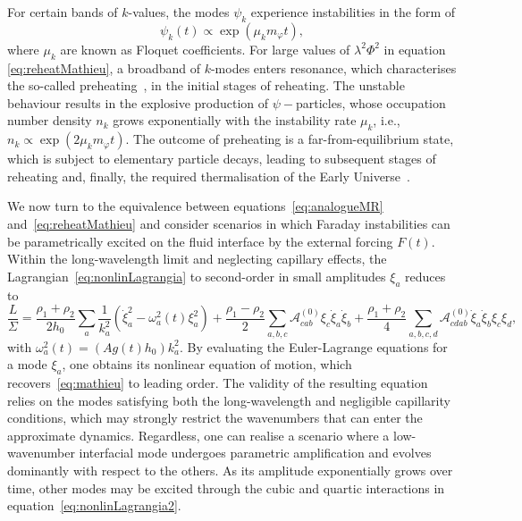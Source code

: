 \documentclass[a4paper]{jpconf}
\newcommand{\pow}[2]{#1^{(#2)}}
\begin{document}
For certain bands of $k$-values, the modes $\psi_k$ experience instabilities in the form of
\begin{equation}
    \psi_k (t)\propto \exp(\mu_k m_{\varphi} t),
\end{equation}
where $\mu_k$ are known as Floquet coefficients. For large values of $\lambda^2\Phi^2$ in equation \eqref{eq:reheatMathieu}, a broadband of $k$-modes enters resonance, which characterises the so-called preheating~\cite{Kofman94}, in the initial stages of reheating. The unstable behaviour results in the explosive production of $\psi-$particles, whose occupation number density $n_k$ grows exponentially with the instability rate $\mu_k$, i.e., $n_k\propto \exp(2\mu_k m_\varphi t)$. The outcome of preheating is a far-from-equilibrium state, which is subject to elementary particle decays, leading to subsequent stages of reheating and, finally, the required thermalisation of the Early Universe~\cite{Mukhanov2005PhysicalCosmology}. 

We now turn to the equivalence between equations~\eqref{eq:analogueMR} and~\eqref{eq:reheatMathieu} and consider scenarios in which Faraday instabilities can be parametrically excited on the fluid interface by the external forcing $F(t)$. Within the long-wavelength limit and neglecting capillary effects, the Lagrangian~\eqref{eq:nonlinLagrangia} to second-order in small amplitudes $\xi_a$ reduces to
\begin{equation}
\label{eq:nonlinLagrangia2}
    \frac{L}{\Sigma}
    =\frac{\rho_1+\rho_2}{2h_0}\sum_a\frac{1}{k_a^2}\left(\dot{\xi}_a^2-\omega_a^2(t)\xi_a^2\right)
    +\frac{\rho_1-\rho_2}{2}\sum_{a,b,c}\pow{\mathcal{A}}{0}_{cab}\xi_c\dot{\xi}_a\dot{\xi}_b
    +\frac{\rho_1+\rho_2}{4}\sum_{a,b,c,d}\pow{\mathcal{A}}{0}_{cdab}\dot{\xi}_a\dot{\xi}_b\xi_c\xi_d,
\end{equation}
with $\omega_a^2(t)=(Ag(t)h_0)k_a^2$. By evaluating the Euler-Lagrange equations for a mode $\xi_a$, one obtains its nonlinear equation of motion, which recovers~\eqref{eq:mathieu} to leading order. The validity of the resulting equation relies on the modes satisfying both the long-wavelength and negligible capillarity conditions, which may strongly restrict the wavenumbers that can enter the approximate dynamics. Regardless, one can realise a scenario where a low-wavenumber interfacial mode undergoes parametric amplification and evolves dominantly with respect to the others. As its amplitude exponentially grows over time, other modes may be excited through the cubic and quartic interactions in equation~\eqref{eq:nonlinLagrangia2}. 
\end{document}
